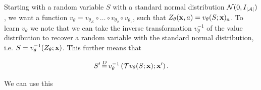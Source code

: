 \documentclass[twoside]{article}
\begin{document}

Starting with a random variable \(S\) with a standard normal distribution
\(\mathcal{N}(0, I_{\lvert \mathcal{A} \rvert})\), we want a function \(v_\theta = v_{\theta_K}
\circ \dots \circ v_{\theta_2} \circ v_{\theta_1} \), such that
\(Z_\theta(\textbf{x}, a) = v_\theta(S; \textbf{x})_a\). To learn \(v_\theta\) we note that
we can take the inverse transformation \(v^{-1}_\theta\) of the value
distribution to recover a random variable with the standard normal distribution,
i.e. \(S = v^{-1}_\theta(Z_\theta; \textbf{x})\). This further means that

\begin{equation}
  S^\prime \eqdist v^{-1}_\theta \left(\T v_\theta(S; \rvx); \rvx^\prime \right).
\end{equation}

We can use this
\end{document}
